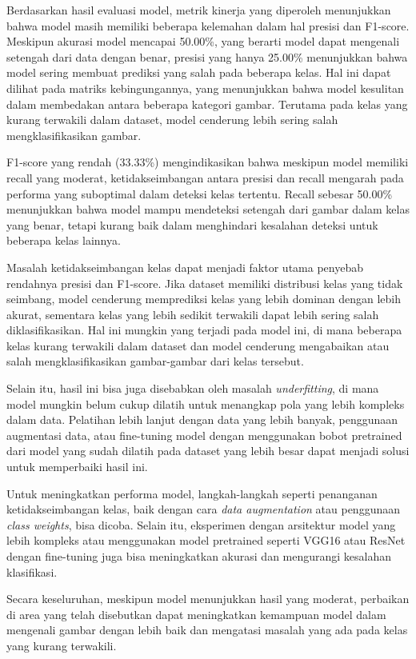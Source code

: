 \documentclass[12pt,a4paper]{article}
\begin{document}
Berdasarkan hasil evaluasi model, metrik kinerja yang diperoleh menunjukkan bahwa model masih memiliki beberapa kelemahan dalam hal presisi dan F1-score. Meskipun akurasi model mencapai 50.00\%, yang berarti model dapat mengenali setengah dari data dengan benar, presisi yang hanya 25.00\% menunjukkan bahwa model sering membuat prediksi yang salah pada beberapa kelas. Hal ini dapat dilihat pada matriks kebingungannya, yang menunjukkan bahwa model kesulitan dalam membedakan antara beberapa kategori gambar. Terutama pada kelas yang kurang terwakili dalam dataset, model cenderung lebih sering salah mengklasifikasikan gambar.

F1-score yang rendah (33.33\%) mengindikasikan bahwa meskipun model memiliki recall yang moderat, ketidakseimbangan antara presisi dan recall mengarah pada performa yang suboptimal dalam deteksi kelas tertentu. Recall sebesar 50.00\% menunjukkan bahwa model mampu mendeteksi setengah dari gambar dalam kelas yang benar, tetapi kurang baik dalam menghindari kesalahan deteksi untuk beberapa kelas lainnya.

Masalah ketidakseimbangan kelas dapat menjadi faktor utama penyebab rendahnya presisi dan F1-score. Jika dataset memiliki distribusi kelas yang tidak seimbang, model cenderung memprediksi kelas yang lebih dominan dengan lebih akurat, sementara kelas yang lebih sedikit terwakili dapat lebih sering salah diklasifikasikan. Hal ini mungkin yang terjadi pada model ini, di mana beberapa kelas kurang terwakili dalam dataset dan model cenderung mengabaikan atau salah mengklasifikasikan gambar-gambar dari kelas tersebut.

Selain itu, hasil ini bisa juga disebabkan oleh masalah \textit{underfitting}, di mana model mungkin belum cukup dilatih untuk menangkap pola yang lebih kompleks dalam data. Pelatihan lebih lanjut dengan data yang lebih banyak, penggunaan augmentasi data, atau fine-tuning model dengan menggunakan bobot pretrained dari model yang sudah dilatih pada dataset yang lebih besar dapat menjadi solusi untuk memperbaiki hasil ini.

Untuk meningkatkan performa model, langkah-langkah seperti penanganan ketidakseimbangan kelas, baik dengan cara \textit{data augmentation} atau penggunaan \textit{class weights}, bisa dicoba. Selain itu, eksperimen dengan arsitektur model yang lebih kompleks atau menggunakan model pretrained seperti VGG16 atau ResNet dengan fine-tuning juga bisa meningkatkan akurasi dan mengurangi kesalahan klasifikasi.

Secara keseluruhan, meskipun model menunjukkan hasil yang moderat, perbaikan di area yang telah disebutkan dapat meningkatkan kemampuan model dalam mengenali gambar dengan lebih baik dan mengatasi masalah yang ada pada kelas yang kurang terwakili.
\end{document}
